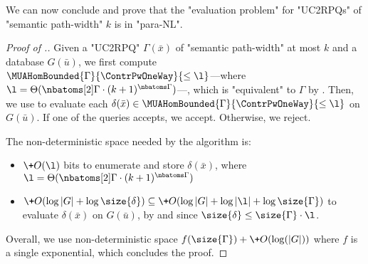 We can now conclude and prove that the "evaluation problem" for "UC2RPQs" of
"semantic path-width" $k$ is in "para-NL".
\begin{proof}[Proof of .]
	Given a "UC2RPQ"
	$\Gamma(\bar x)$ of "semantic path-width" at most $k$ and a database $G(\bar u)$, we
	first compute $\MUAHomBounded{\Gamma}{\ContrPwOneWay}{\leq\l}$---where $\l = \lbound{k}{\Gamma}$---, which is "equivalent" to
	$\Gamma$ by .
	Then, we use  to evaluate each
	$\delta(\bar x) \in \MUAHomBounded{\Gamma}{\ContrPwOneWay}{\leq\l}$ on $G(\bar u)$.
	If one of the queries accepts, we accept. Otherwise, we reject.

	The non-deterministic space needed by the algorithm is:
	\begin{itemize}
		\item $\+O(\l)$ bits to enumerate and store $\delta(\bar x)$, where $\l = \lbound{k}{\Gamma} $ 
		\item $\+O(\log{|G|} + \log{\size{\delta}}) \subseteq \+O(\log{|G|} + \log{|\l|} + \log{\size{\Gamma}})$ to evaluate
		$\delta(\bar x)$ on $G(\bar u)$, by 
		and since $\size{\delta} \leq \size{\Gamma}\cdot \l$.
	\end{itemize}
	Overall, we use non-deterministic space $f(\size{\Gamma}) + \+O(\log(|G|))$
	where $f$ is a single exponential, which concludes the proof.
\end{proof}